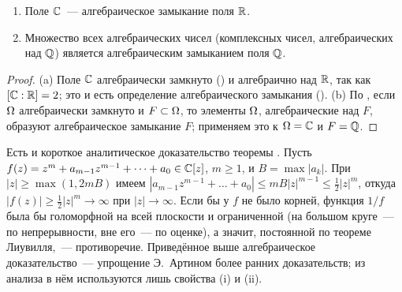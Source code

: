 \begin{keepfig}
\begin{center}
\end{center}
\end{keepfig}

\begin{corollary}[5.7]
\begin{enumerate}[label=\textup{(\alph*)}]
\item Поле $\mathbb C$~--- алгебраическое замыкание поля $\mathbb R$.
\item Множество всех алгебраических чисел (комплексных чисел, алгебраических над $\mathbb Q$) является алгебраическим
замыканием поля $\mathbb Q$.
\end{enumerate}
\end{corollary}

\begin{proof}
(a) Поле $\mathbb C$ алгебраически замкнуто () и алгебраично над $\mathbb R$, так как $[\mathbb C:\mathbb R]=2$; это и есть определение
алгебраического замыкания (). (b) По , если $\Omega$ алгебраически замкнуто и $F\subset\Omega$, то элементы $\Omega$,
алгебраические над $F$, образуют алгебраическое замыкание $F$; применяем это к $\Omega=\mathbb C$ и $F=\mathbb Q$.
\end{proof}

\begin{aside}[5.7a]
Есть и короткое аналитическое доказательство теоремы . Пусть $f(z)=z^m+a_{m-1}z^{m-1}+\dots+a_0\in\mathbb C[z]$, $m\ge1$, и
$B=\max|a_k|$. При $|z|\ge\max(1,2mB)$ имеем $|a_{m-1}z^{m-1}+\dots+a_0|\le mB|z|^{m-1}\le\frac12|z|^m$, откуда
$|f(z)|\ge\frac12|z|^m\to\infty$ при $|z|\to\infty$. Если бы у $f$ не было корней, функция $1/f$ была бы голоморфной на
всей плоскости и ограниченной (на большом круге~--- по непрерывности, вне его~--- по оценке), а значит, постоянной по
теореме Лиувилля,~--- противоречие. Приведённое выше алгебраическое доказательство~--- упрощение Э.~Артином более ранних
доказательств; из анализа в нём используются лишь свойства (i) и (ii).
\end{aside}
